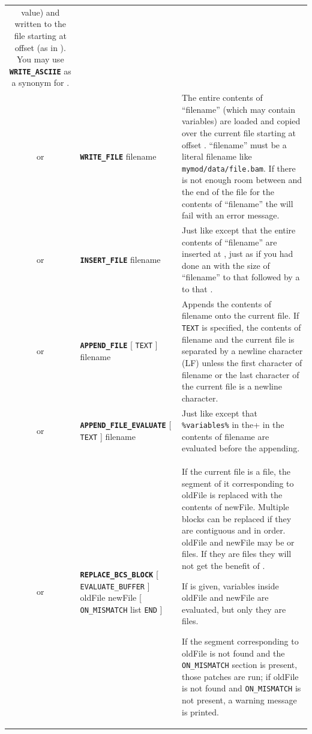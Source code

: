\documentclass{article}
\def\ttref#1{\ahrefloc{#1}{\tt #1}}
\def\DEFINE#1{{\tt \bf #1}\label{#1}\index{#1}}
\def\t#1{{\tt #1}}
\def\Slist{{\color{red} list }}
\def\Ob{{\color{red} [ }}
\def\Oe{{\color{red} ] }}
\begin{document}
\begin{tabular}{cp{10in}|p{10in}}
  value) and written to the file starting at offset (as in
  \ttref{WRITE_ASCII}). You may use \DEFINE{WRITE_ASCIIE} as a synonym
  for \ttref{WRITE_EVALUATED_ASCII}. \\
or & \DEFINE{WRITE_FILE} \ttref{offset} filename &
  The entire contents of ``filename'' (which may contain variables) are
  loaded and copied over the current file starting at offset
  \ttref{offset}. ``filename'' must be a literal filename like
  \t{mymod/data/file.bam}. If there is not enough room between
  \ttref{offset} and the end of the file for the contents of ``filename''
  the \ttref{patch} will fail with an error message. \\
or & \DEFINE{INSERT_FILE} \ttref{offset} filename &
  Just like \ttref{WRITE_FILE} except that the entire contents of
  ``filename'' are inserted at \ttref{offset}, just as if you had done an
  \ttref{INSERT_BYTES} with the size of ``filename'' to that \ttref{offset}
  followed by a \ttref{WRITE_FILE} to that \ttref{offset}. \\

  or & \DEFINE{APPEND_FILE} \Ob \t{TEXT} \Oe filename &

  Appends the contents of filename onto the current file. If \t{TEXT}
  is specified, the contents of filename and the current file is
  separated by a newline character (LF) unless the first character of
  filename or the last character of the current file is a newline
  character. \\

  or & \DEFINE{APPEND_FILE_EVALUATE} \Ob \t{TEXT} \Oe filename &

  Just like \ttref{APPEND_FILE} except that \verb+%variables%+ in the
  contents of filename are evaluated before the appending. \\

or & \DEFINE{REPLACE_BCS_BLOCK} \Ob \t{EVALUATE_BUFFER} \Oe \ttref{optcase}
     oldFile newFile \Ob \t{ON_MISMATCH} \ttref{patch} \Slist \t{END} \Oe &
  If the current file is a \ttref{BCS} file, the segment of it
  corresponding to oldFile is replaced with the contents of newFile.
  Multiple blocks can be replaced if they are contiguous and in order.
  oldFile and newFile may be \ttref{BCS} or \ttref{BAF} files. If they
  are \ttref{BAF} files they will not get the benefit of \ttref{AUTO_TRA}.

  If \ttref{EVALUATE_BUFFER} is given, variables inside oldFile and newFile are
  evaluated, but only they are \ttref{BAF} files.

  If the segment corresponding to oldFile is not found and the
  \t{ON_MISMATCH} section is present, those patches are run; if
  oldFile is not found and \t{ON_MISMATCH} is not present, a warning
  message is printed.


\end{tabular}
\end{document}
